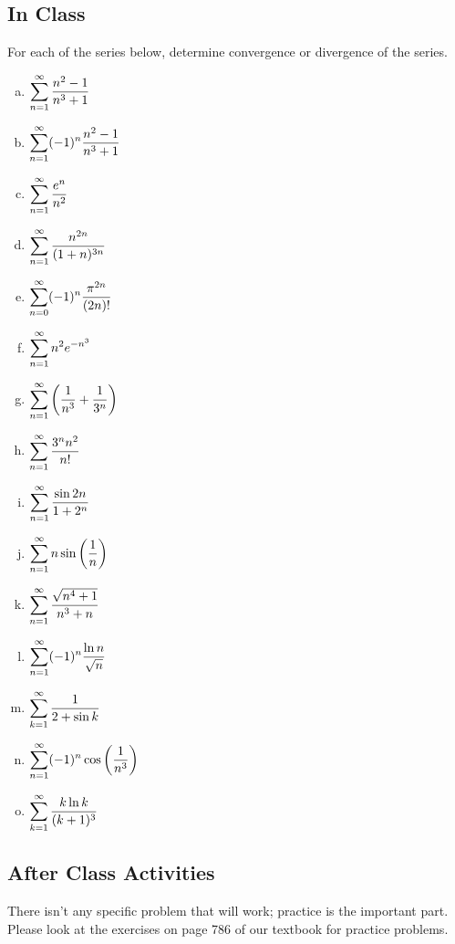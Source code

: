 \documentclass[notes]{subfiles}
\begin{document}
	\subsection*{In Class}
		\begin{ex}
			For each of the series below, determine convergence or divergence of the series.
			\begin{enumerate}[(a)]
				\item $\displaystyle \sum_{n=1}^\infty \dfrac{n^2-1}{n^3+1}$
					
				\item $\displaystyle \sum_{n=1}^\infty (-1)^n\dfrac{n^2-1}{n^3+1}$
					
				\item $\displaystyle \sum_{n=1}^\infty \dfrac{e^n}{n^2}$
					
				\item $\displaystyle \sum_{n=1}^\infty \dfrac{n^{2n}}{(1+n)^{3n}}$
					
				\item $\displaystyle \sum_{n=0}^\infty (-1)^n \dfrac{\pi^{2n}}{(2n)!}$
					\newpage
					
				\item $\displaystyle \sum_{n=1}^\infty n^2e^{-n^3}$
					
				\item $\displaystyle \sum_{n=1}^\infty \left( \dfrac{1}{n^3} + \dfrac{1}{3^n}\right)$
					
				\item $\displaystyle \sum_{n=1}^\infty \dfrac{3^nn^2}{n!}$
					
				\item $\displaystyle \sum_{n=1}^\infty \dfrac{\sin 2n}{1+2^n}$
					
				\item $\displaystyle \sum_{n=1}^\infty n\sin\left( \dfrac{1}{n}\right)$
					\newpage
				
				\item $\displaystyle \sum_{n=1}^\infty \dfrac{\sqrt{n^4+1}}{n^3 + n}$
					
				\item $\displaystyle \sum_{n=1}^\infty (-1)^n \dfrac{\ln n}{\sqrt{n}}$
					
				\item $\displaystyle \sum_{k=1}^\infty \dfrac{1}{2+\sin k}$
					
				\item $\displaystyle \sum_{n=1}^\infty (-1)^n\cos\left( \dfrac{1}{n^3}\right)$
					
				\item $\displaystyle \sum_{k=1}^\infty \dfrac{k\ln k}{(k+1)^3}$
			\end{enumerate}
		\end{ex}
			\newpage
			
	\subsection*{After Class Activities}
		\begin{ex}
			There isn't any specific problem that will work; practice is the important part.  Please look at the exercises on page 786 of our textbook for practice problems.
		\end{ex}
	
\clearpage
\end{document}
